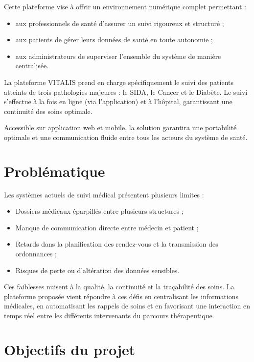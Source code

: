 ﻿\documentclass[12pt,a4paper]{report}
\begin{document}
Cette plateforme vise à offrir un environnement numérique complet permettant :  
\begin{itemize}
    \item aux professionnels de santé d'assurer un suivi rigoureux et structuré ;
    \item aux patients de gérer leurs données de santé en toute autonomie ;
    \item aux administrateurs de superviser l'ensemble du système de manière centralisée.
\end{itemize}

La plateforme VITALIS prend en charge spécifiquement le suivi des patients atteints de trois pathologies majeures : le SIDA, le Cancer et le Diabète. Le suivi s'effectue à la fois en ligne (via l'application) et à l'hôpital, garantissant une continuité des soins optimale.

Accessible sur application web et mobile, la solution garantira une portabilité optimale et une communication fluide entre tous les acteurs du système de santé.  

\newpage  
\section*{Problématique}  

Les systèmes actuels de suivi médical présentent plusieurs limites :  
\begin{itemize}
    \item Dossiers médicaux éparpillés entre plusieurs structures ;
    \item Manque de communication directe entre médecin et patient ;
    \item Retards dans la planification des rendez-vous et la transmission des ordonnances ;
    \item Risques de perte ou d’altération des données sensibles.
\end{itemize}

Ces faiblesses nuisent à la qualité, la continuité et la traçabilité des soins.  
La plateforme proposée vient répondre à ces défis en centralisant les informations médicales, en automatisant les rappels de soins et en favorisant une interaction en temps réel entre les différents intervenants du parcours thérapeutique.  

\newpage  
\section*{Objectifs du projet}  
\end{document}
